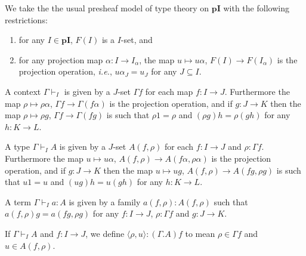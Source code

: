 \documentclass{PaperTools/latex/llncs}
\def\pI{\ensuremath{\mathbf{pI}}}
\def\ie{\textit{i.e.}}
\begin{document}
\bigskip
We take the the usual presheaf model of type theory on \pI{} with the
following restrictions:
\begin{enumerate}
  \item for any $I ∈ \pI$, $F(I)$ is a $I$-set, and
  \item for any projection map $α : I → I_α$, the
    map $u ↦ uα$, $F(I) → F(I_α)$ is the projection operation, \ie,
    $uα_J = u_J$ for any $J ⊆ I$.
\end{enumerate}

\bigskip
A context $Γ ⊢_I$ is given by a $J$-set $Γf$ for each map $f : I → J$.
Furthermore the map $ρ ↦ ρα$, $Γf → Γ(fα)$ is the projection operation,
and if $g : J → K$ then the map $ρ ↦ ρg$, $Γf → Γ(fg)$ is such that
$ρ1 = ρ$ and $(ρg)h = ρ(gh)$ for any $h : K → L$.

\medskip
A type $Γ ⊢_I A$ is given by a $J$-set $A(f,ρ)$ for each $f : I → J$ and
$ρ : Γf$.
Furthermore the map $u ↦ uα$, $A(f,ρ) → A(fα,ρα)$ is the projection operation,
and if $g : J → K$ then the map $u ↦ ug$, $A(f,ρ) → A(fg,ρg)$ is such that
$u1 = u$ and $(ug)h = u(gh)$ for any $h : K → L$.

\medskip
A term $Γ ⊢_I a : A$ is given by a family $a(f,ρ) : A(f,ρ)$ such that
$a(f,ρ)g = a(fg,ρg)$ for any $f : I → J$, $ρ : Γf$ and $g : J → K$.

\medskip
If $Γ ⊢_I A$ and $f : I → J$, we define $⟨ρ,u⟩ : (Γ.A)f$ to mean
$ρ ∈ Γf$ and $u ∈ A(f,ρ)$.
\end{document}
